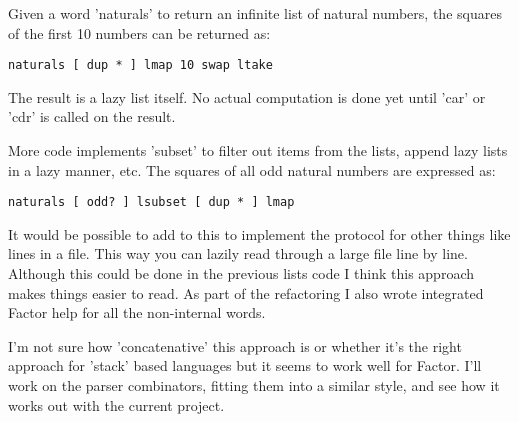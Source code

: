 Given a word 'naturals' to return an infinite list of natural numbers,
 the squares of the first 10 numbers can be returned as:

\begin{verbatim}
naturals [ dup * ] lmap 10 swap ltake
\end{verbatim}


The result is a lazy list itself. No actual computation is done yet
until 'car' or 'cdr' is called on the result.

More code implements 'subset' to filter out items from the lists,
append lazy lists in a lazy manner, etc. The squares of all odd
natural numbers are expressed as:

\begin{verbatim}
naturals [ odd? ] lsubset [ dup * ] lmap
\end{verbatim}


It would be possible to add to this to implement the protocol for
other things like lines in a file. This way you can lazily read
through a large file line by line. Although this could be done in the
previous lists code I think this approach makes things easier to
read. As part of the refactoring I also wrote integrated Factor help
for all the non-internal words.

I'm not sure how 'concatenative' this approach is or whether it's the
right approach for 'stack' based languages but it seems to work well
for Factor. I'll work on the parser combinators, fitting them into a
similar style, and see how it works out with the current project.


